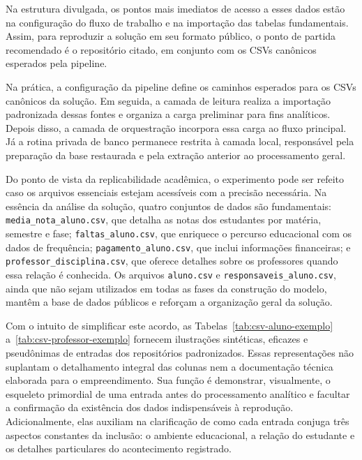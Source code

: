 Na estrutura divulgada, os pontos mais imediatos de acesso a esses dados est\~ao na configura\c{c}\~ao do fluxo de trabalho e na importa\c{c}\~ao das tabelas fundamentais. Assim, para reproduzir a solu\c{c}\~ao em seu formato p\'ublico, o ponto de partida recomendado \'e o reposit\'orio citado, em conjunto com os CSVs can\^onicos esperados pela pipeline.

Na pr\'atica, a configura\c{c}\~ao da pipeline define os caminhos esperados para os CSVs can\^onicos da solu\c{c}\~ao. Em seguida, a camada de leitura realiza a importa\c{c}\~ao padronizada dessas fontes e organiza a carga preliminar para fins anal\'iticos. Depois disso, a camada de orquestra\c{c}\~ao incorpora essa carga ao fluxo principal. J\'a a rotina privada de banco permanece restrita \`a camada local, respons\'avel pela prepara\c{c}\~ao da base restaurada e pela extra\c{c}\~ao anterior ao processamento geral.

Do ponto de vista da replicabilidade acad\^emica, o experimento pode ser refeito caso os arquivos essenciais estejam acess\'iveis com a precis\~ao necess\'aria. Na ess\^encia da an\'alise da solu\c{c}\~ao, quatro conjuntos de dados s\~ao fundamentais: \texttt{media\_nota\_aluno.csv}, que detalha as notas dos estudantes por mat\'eria, semestre e fase; \texttt{faltas\_aluno.csv}, que enriquece o percurso educacional com os dados de frequ\^encia; \texttt{pagamento\_aluno.csv}, que inclui informa\c{c}\~oes financeiras; e \texttt{professor\_disciplina.csv}, que oferece detalhes sobre os professores quando essa rela\c{c}\~ao \'e conhecida. Os arquivos \texttt{aluno.csv} e \texttt{responsaveis\_aluno.csv}, ainda que n\~ao sejam utilizados em todas as fases da constru\c{c}\~ao do modelo, mant\^em a base de dados p\'ublicos e refor\c{c}am a organiza\c{c}\~ao geral da solu\c{c}\~ao.

Com o intuito de simplificar este acordo, as Tabelas~\ref{tab:csv-aluno-exemplo} a~\ref{tab:csv-professor-exemplo} fornecem ilustra\c{c}\~oes sint\'eticas, eficazes e pseud\^onimas de entradas dos reposit\'orios padronizados. Essas representa\c{c}\~oes n\~ao suplantam o detalhamento integral das colunas nem a documenta\c{c}\~ao t\'ecnica elaborada para o empreendimento. Sua fun\c{c}\~ao \'e demonstrar, visualmente, o esqueleto primordial de uma entrada antes do processamento anal\'itico e facultar a confirma\c{c}\~ao da exist\^encia dos dados indispens\'aveis \`a reprodu\c{c}\~ao. Adicionalmente, elas auxiliam na clarifica\c{c}\~ao de como cada entrada conjuga tr\^es aspectos constantes da inclus\~ao: o ambiente educacional, a rela\c{c}\~ao do estudante e os detalhes particulares do acontecimento registrado.

